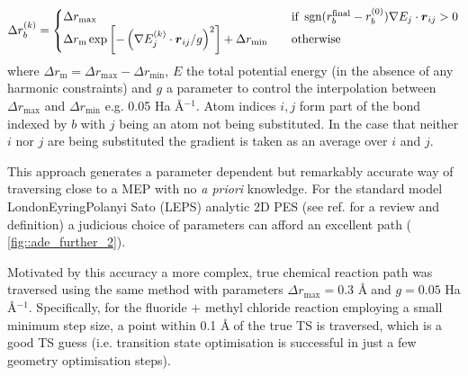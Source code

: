 \documentclass[../../main.tex]{subfiles}
\begin{document}
\begin{equation}
	\Delta r_b^{(k)} = 
	\begin{cases}
		\Delta r_\text{max} \quad &\text{if } \operatorname{sgn}(r_b^\text{final} - r_b^{(0)}) \nabla E_{j} \cdot \boldsymbol{r}_{ij} > 0 \\
		\Delta r_\text{m}\exp\left[-\left({\nabla E_{j}^{(k)} \cdot \boldsymbol{r}_{ij}}/{g} \right)^2\right] + \Delta r_\text{min} \quad &\text{otherwise}
	\end{cases}
\end{equation}
where $\Delta r_\text{m} = \Delta r_\text{max} - \Delta r_\text{min}$, $E$ the total potential energy (in the absence of any harmonic constraints) and $g$ a parameter to control the interpolation between $\Delta r_\text{max}$ and $\Delta r_\text{min}$ e.g. 0.05 Ha Å$^{-1}$. Atom indices $i, j$ form part of the bond indexed by $b$ with $j$ being an atom not being substituted. In the case that neither $i$ nor $j$ are being substituted the gradient is taken as an average over $i$ and $j$.

This approach generates a parameter dependent but remarkably accurate way of traversing close to a MEP with no \emph{a priori} knowledge. For the standard model London{\textendash}Eyring{\textendash}Polanyi {\textendash}Sato (LEPS) analytic 2D PES (see ref. \cite{MartinGondre2010} for a review and definition) a judicious choice of parameters can afford an excellent path (\figurename{ \ref{fig::ade_further_2}}).

Motivated by this accuracy a more complex, true chemical reaction path was traversed using the same method with parameters $\Delta r_\text{max} = 0.3$ \AA$\;$and $g = 0.05$ Ha \AA$^{-1}$. Specifically, for the fluoride + methyl chloride reaction employing a small minimum step size, a point within 0.1 \AA$\;$of the true TS is traversed, which is a good TS guess (i.e. transition state optimisation is successful in just a few geometry optimisation steps).
\end{document}
